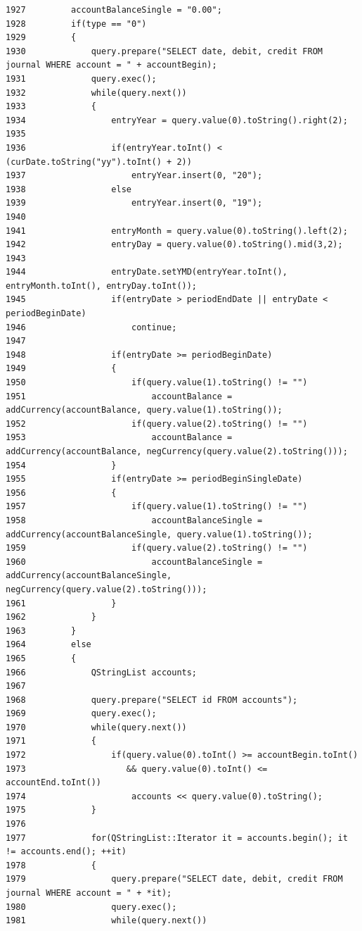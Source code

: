 \begin{verbatim}
1927         accountBalanceSingle = "0.00";
1928         if(type == "0")
1929         {
1930             query.prepare("SELECT date, debit, credit FROM journal WHERE account = " + accountBegin);
1931             query.exec();
1932             while(query.next())
1933             {
1934                 entryYear = query.value(0).toString().right(2);
1935 
1936                 if(entryYear.toInt() < (curDate.toString("yy").toInt() + 2))
1937                     entryYear.insert(0, "20");
1938                 else
1939                     entryYear.insert(0, "19");
1940 
1941                 entryMonth = query.value(0).toString().left(2);
1942                 entryDay = query.value(0).toString().mid(3,2);
1943 
1944                 entryDate.setYMD(entryYear.toInt(), entryMonth.toInt(), entryDay.toInt());
1945                 if(entryDate > periodEndDate || entryDate < periodBeginDate)
1946                     continue;
1947 
1948                 if(entryDate >= periodBeginDate)
1949                 {
1950                     if(query.value(1).toString() != "")
1951                         accountBalance = addCurrency(accountBalance, query.value(1).toString());
1952                     if(query.value(2).toString() != "")
1953                         accountBalance = addCurrency(accountBalance, negCurrency(query.value(2).toString()));
1954                 }
1955                 if(entryDate >= periodBeginSingleDate)
1956                 {
1957                     if(query.value(1).toString() != "")
1958                         accountBalanceSingle = addCurrency(accountBalanceSingle, query.value(1).toString());
1959                     if(query.value(2).toString() != "")
1960                         accountBalanceSingle = addCurrency(accountBalanceSingle, negCurrency(query.value(2).toString()));
1961                 }
1962             }
1963         }
1964         else
1965         {
1966             QStringList accounts;
1967 
1968             query.prepare("SELECT id FROM accounts");
1969             query.exec();
1970             while(query.next())
1971             {
1972                 if(query.value(0).toInt() >= accountBegin.toInt()
1973                    && query.value(0).toInt() <= accountEnd.toInt())
1974                     accounts << query.value(0).toString();
1975             }
1976 
1977             for(QStringList::Iterator it = accounts.begin(); it != accounts.end(); ++it)
1978             {
1979                 query.prepare("SELECT date, debit, credit FROM journal WHERE account = " + *it);
1980                 query.exec();
1981                 while(query.next())

\end{verbatim}
